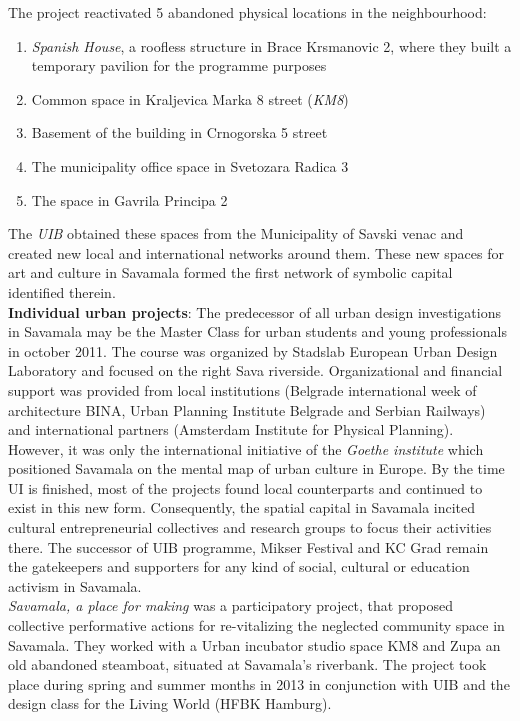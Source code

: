\documentclass[11pt]{report}
\begin{document}
The project reactivated 5 abandoned physical locations in the neighbourhood:
\begin{enumerate}
\item \textit{Spanish House}, a roofless structure in Brace Krsmanovic 2, where they built a temporary pavilion for the programme purposes
\item Common space in Kraljevica Marka 8 street (\textit{KM8})
\item Basement of the building in Crnogorska 5 street
\item The municipality office space in Svetozara Radica 3
\item The space in Gavrila Principa 2
\end{enumerate}
The \textit{UIB} obtained these spaces from the Municipality of Savski venac and created new local and international networks around them. These new spaces for art and culture in Savamala formed the first network of symbolic capital identified therein.
\\
\textbf{Individual urban projects}:
The predecessor of all urban design investigations in Savamala may be the Master Class for urban students and young professionals in october 2011. The course was organized by Stadslab European Urban Design Laboratory and focused on the right Sava riverside. Organizational and financial support was provided from local institutions (Belgrade international week of architecture BINA, Urban Planning Institute Belgrade and Serbian Railways) and international partners (Amsterdam Institute for Physical Planning).
\\
However, it was only the international initiative of the \textit{Goethe institute} which positioned Savamala on the mental map of urban culture in Europe. \cite{(Kamenzind, Interview director Goethe institute 2013)} By the time UI is finished, most of the projects found local counterparts and continued to exist in this new form. Consequently, the spatial capital in Savamala incited cultural entrepreneurial collectives and research groups to focus their activities there. The successor of UIB programme, Mikser Festival and KC Grad remain the gatekeepers and supporters for any kind of social, cultural or education activism in Savamala.
\\
\textit{Savamala, a place for making} was a participatory project, that proposed collective performative actions for re-vitalizing the neglected community space in Savamala. They worked with a Urban incubator studio space KM8 and Zupa an old abandoned steamboat, situated at Savamala’s riverbank. The project took place during spring and summer months in 2013 in conjunction with UIB and the design class for the Living World (HFBK Hamburg).
\end{document}
